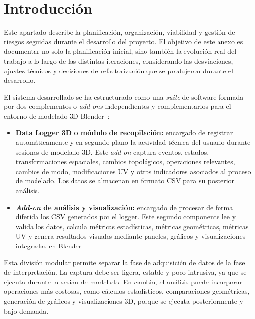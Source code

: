 \label{apendice:plan-proyecto-software}

\section{Introducción}
\label{sec:a-introduccion}

Este apartado describe la planificación, organización, viabilidad y gestión de riesgos seguidas durante el desarrollo del proyecto. El objetivo de este anexo es documentar no solo la planificación inicial, sino también la evolución real del trabajo a lo largo de las distintas iteraciones, considerando las desviaciones, ajustes técnicos y decisiones de refactorización que se produjeron durante el desarrollo.

El sistema desarrollado se ha estructurado como una \textit{suite} de software formada por dos complementos o \textit{add-ons} independientes y complementarios para el entorno de modelado 3D Blender~\cite{blenderapi}:

\begin{itemize}
    \item \textbf{Data Logger 3D o módulo de recopilación:} encargado de registrar automáticamente y en segundo plano la actividad técnica del usuario durante sesiones de modelado 3D. Este \textit{add-on} captura eventos, estados, transformaciones espaciales, cambios topológicos, operaciones relevantes, cambios de modo, modificaciones UV y otros indicadores asociados al proceso de modelado. Los datos se almacenan en formato CSV para su posterior análisis.

    \item \textbf{\textit{Add-on} de análisis y visualización:} encargado de procesar de forma diferida los CSV generados por el logger. Este segundo componente lee y valida los datos, calcula métricas estadísticas, métricas geométricas, métricas UV y genera resultados visuales mediante paneles, gráficos y visualizaciones integradas en Blender.
\end{itemize}

Esta división modular permite separar la fase de adquisición de datos de la fase de interpretación. La captura debe ser ligera, estable y poco intrusiva, ya que se ejecuta durante la sesión de modelado. En cambio, el análisis puede incorporar operaciones más costosas, como cálculos estadísticos, comparaciones geométricas, generación de gráficos y visualizaciones 3D, porque se ejecuta posteriormente y bajo demanda.

